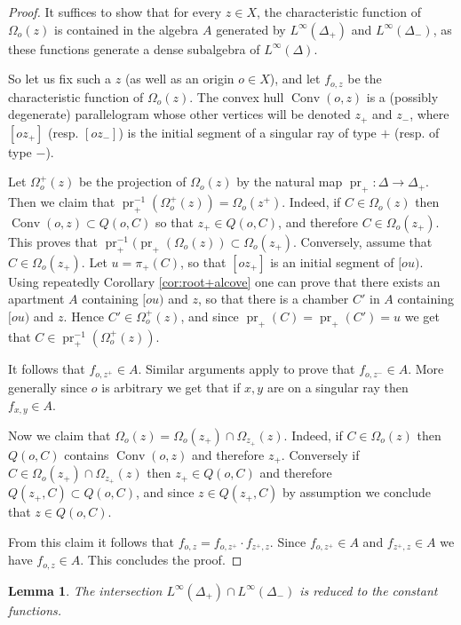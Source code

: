 \documentclass[a4paper, 11pt]{article}
\theoremstyle{plain}
\newtheorem{lemma}[proposition]{Lemma}
\theoremstyle{definition}
\theoremstyle{remark}
\DeclareMathOperator{\Conv}{Conv}
\DeclareMathOperator{\pr}{pr}
\begin{document}
\begin{proof}
It suffices to show that for every $z\in X$, the characteristic function of $\Omega_o(z)$ is contained in the algebra $A$ generated by $L^\infty(\Delta_+)$ and $L^\infty(\Delta_-)$, as these functions generate a dense subalgebra of $L^\infty(\Delta)$.

So let us fix such a $z$ (as well as an origin $o\in X$), and let $f_{o,z}$ be the characteristic function of $\Omega_o(z)$. The convex hull $\Conv(o,z)$ is a (possibly degenerate) parallelogram whose other vertices will be denoted $z_+$ and $z_-$, where $[oz_+]$ (resp. $[oz_-]$) is the initial segment of a singular ray of type $+$ (resp. of type $-$). 


Let $\Omega_o^+(z)$ be the projection of $\Omega_o(z)$ by the natural map $\pr_+:\Delta\to\Delta_+$. Then we claim that $\pr_+^{-1}(\Omega_o^+(z))=\Omega_o(z^+)$. Indeed, if $C\in \Omega_o(z)$ then $\Conv(o,z)\subset Q(o,C)$ so that $z_+\in Q(o,C)$, and therefore $C\in \Omega_o(z_+)$. This proves that $\pr_+^{-1}(\pr_+(\Omega_o(z))\subset \Omega_o(z_+)$. Conversely, assume that $C\in \Omega_o(z_+)$. Let $u=\pi_+(C)$, so that $[oz_+]$ is an initial segment of $[ou)$. Using repeatedly Corollary \ref{cor:root+alcove} one can prove that there exists an apartment $A$ containing $[ou)$ and $z$, so that there is a chamber $C'$ in $A$ containing $[ou)$ and $z$. Hence $C'\in \Omega_o^+(z)$, and since $\pr_+(C)=\pr_+(C')=u$ we get that $C\in \pr_+^{-1}(\Omega_o^+(z))$.


It follows that $f_{o,z^+}\in A$. Similar arguments apply to prove that $f_{o,z^-}\in A$. More generally since $o$ is arbitrary we get that if $x,y$ are on a singular ray then $f_{x,y}\in A$. 

Now we claim that $\Omega_o(z)=\Omega_o(z_+)\cap \Omega_{z_+}(z)$. Indeed, if $C\in \Omega_o(z)$ then $Q(o,C)$ contains $\Conv(o,z)$ and therefore $z_+$. Conversely if $C\in \Omega_o(z_+)\cap \Omega_{z_+}(z)$ then $z_+\in Q(o,C)$ and therefore $Q(z_+,C)\subset Q(o,C)$, and since $z\in Q(z_+,C)$ by assumption we conclude that $z\in Q(o,C)$.

From this claim it follows that $f_{o,z}=f_{o,z^+}\cdot f_{z^+,z}$. Since $f_{o,z^+}\in A$ and $f_{z^+,z}\in A$ we have $f_{o,z}\in A$. This concludes the proof.

\end{proof}

\begin{lemma}\label{lem:meet}
The intersection $L^\infty(\Delta_+)\cap L^\infty(\Delta_-)$ is reduced to the constant functions.
\end{lemma}
\end{document}
